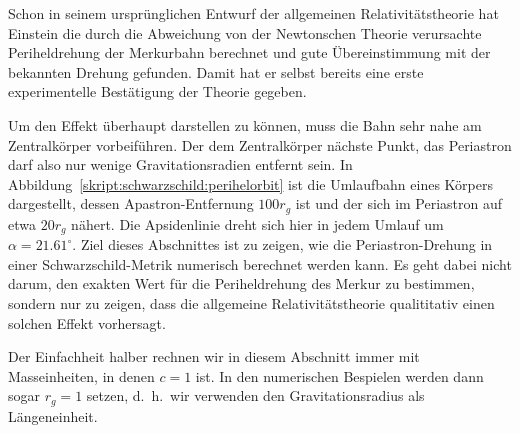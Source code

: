 Schon in seinem ursprünglichen Entwurf der allgemeinen Relativitätstheorie
hat Einstein die durch die Abweichung von der Newtonschen Theorie
verursachte Periheldrehung der Merkurbahn berechnet und gute Übereinstimmung
mit der bekannten Drehung gefunden.
Damit hat er selbst bereits eine erste experimentelle Bestätigung
der Theorie gegeben.

Um den Effekt überhaupt darstellen zu können, muss die Bahn sehr nahe
am Zentralkörper vorbeiführen.
Der dem Zentralkörper nächste Punkt, das Periastron darf
also nur wenige Gravitationsradien entfernt sein.
In Abbildung~\ref{skript:schwarzschild:perihelorbit} ist die
Umlaufbahn eines Körpers dargestellt, dessen Apastron-Entfernung
$100 r_g$ ist und der sich im Periastron auf etwa $20r_g$ 
nähert.
Die Apsidenlinie dreht sich hier in jedem Umlauf um $\alpha = 21.61^\circ$.
Ziel dieses Abschnittes ist zu zeigen, wie die Periastron-Drehung
in einer Schwarzschild-Metrik numerisch berechnet werden kann.
Es geht dabei nicht darum, den exakten Wert für die Periheldrehung
des Merkur zu bestimmen,
sondern nur zu zeigen, dass die allgemeine Relativitätstheorie
qualititativ einen solchen Effekt vorhersagt.

Der Einfachheit halber rechnen wir in diesem Abschnitt immer mit
Masseinheiten, in denen $c=1$ ist.
In den numerischen Bespielen werden dann sogar $r_g=1$ setzen,
d.~h.~wir verwenden den Gravitationsradius als Längeneinheit.

